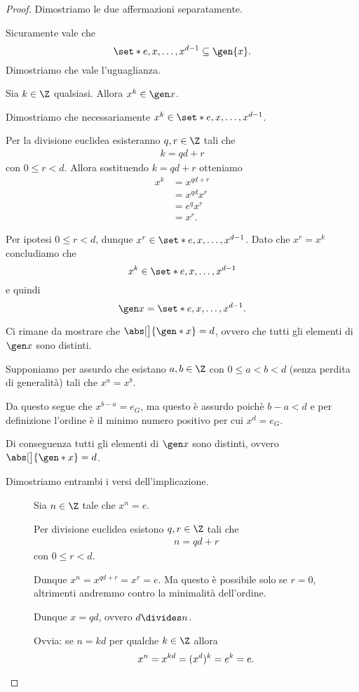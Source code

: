 \begin{proof}
    Dimostriamo le due affermazioni separatamente. 
    
     Sicuramente vale che \[
        \set*{e, x, \dots, x^{d-1}} \subseteq \gen{x}.    
    \] Dimostriamo che vale l'uguaglianza.

    Sia $k \in \Z$ qualsiasi. Allora $x^k \in \gen x$. 
    
    Dimostriamo che necessariamente $x^k \in \set*{e, x, \dots, x^{d-1}}$.

    Per la divisione euclidea esisteranno $q, r \in \Z$ tali che \begin{align*}
        k = qd + r
    \end{align*} con $0 \leq r < d$. Allora sostituendo $k = qd+r$ otteniamo \begin{align*}
        x^k &= x^{qd + r}\\
        &= x^{qd}x^r\\
        &= e^qx^r\\
        &= x^r.
    \end{align*}
    
    Per ipotesi $0 \leq r < d$, dunque $x^r \in \set*{e, x, \dots, x^{d-1}}$. Dato che $x^r = x^k$ concludiamo che \[
        x^k \in \set*{e, x, \dots, x^{d-1}}    
    \] e quindi \[
        \gen x = \set*{e, x, \dots, x^{d-1}}.    
    \]

    Ci rimane da mostrare che $\abs[\big]{\gen* x} = d$, ovvero che tutti gli elementi di $\gen x$ sono distinti. 

    Supponiamo per assurdo che esistano $a, b \in \Z$ con $0 \leq a < b < d$ (senza perdita di generalità) tali che $x^a = x^b$.

    Da questo segue che $x^{b-a} = e_G$, ma questo è assurdo poichè $b-a < d$ e per definizione l'ordine è il minimo numero positivo per cui $x^d = e_G$.

    Di conseguenza tutti gli elementi di $\gen x$ sono distinti, ovvero $\abs[\big]{\gen* x} = d$.

     Dimostriamo entrambi i versi dell'implicazione.
    \begin{description}
        \item[\boximpl ] Sia $n \in \Z$ tale che $x^n = e$.
        
        Per divisione euclidea esistono $q, r \in \Z$ tali che \begin{align*}
            n = qd + r
        \end{align*} con $0 \leq r < d$.

        Dunque $x^n = x^{qd+r} = x^r = e$. Ma questo è possibile solo se $r = 0$, altrimenti andremmo contro la minimalità dell'ordine.
        
        Dunque $x = qd$, ovvero $d \divides n$.
        \item[\boximplby] Ovvia: se $n = kd$ per qualche $k \in \Z$ allora \[
            x^n = x^{kd} = (x^d)^k = e^k = e.\qedhere    
        \]
    \end{description}
\end{proof}

